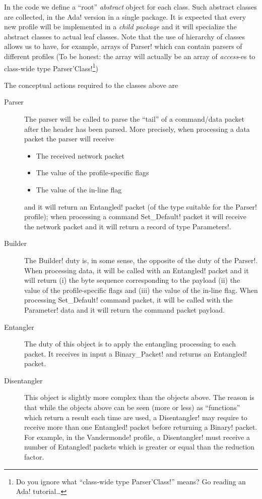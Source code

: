 \documentclass[a4paper]{medusabook}
\begin{document}
%
In the code we define a ``root'' \emph{abstract} object for each
class.  Such abstract classes are collected, in the \ttt Ada! version
in a single package.  It is expected that every new profile will be
implemented in a \emph{child package} and it will specialize the
abstract classes to actual leaf classes.  Note that the use of
hierarchy of classes allows us to have, for example, arrays of \ttt
Parser! which can contain parsers of different profiles (To be honest:
the array will actually be an array of \emph{access}-es to class-wide
type \ttt Parser'Class!\footnote{Do you ignore what ``class-wide
type \ttt Parser'Class!'' means? Go reading an \ttt Ada!
tutorial\ldots})

The conceptual actions required to the classes above are

\begin{description}
  \item[Parser]  The parser will be called to parse the ``tail'' of a
  command/data packet after the header has been parsed.  More
  precisely, when processing a data packet the parser will receive
  \begin{itemize}
    \item The received network packet
    \item The value of the profile-specific flags
    \item The value of the in-line flag
  \end{itemize}
  and it will return an \ttt Entangled! packet (of the type suitable for the
  \ttt Parser! profile); when processing a command \ttt Set_Default!
  packet it will receive the network packet and it will return a
  record of type \ttt Parameters!.
%
  \item[Builder] The \ttt Builder! duty is, in some sense, the
  opposite of the duty of the \ttt Parser!.  When processing data, it
  will be called with an \ttt Entangled! packet and it will return (i)
  the byte sequence corresponding to the payload (ii) the value of the
  profile-specific flags and (iii) the value of the in-line flag.  When
  processing \ttt Set_Default! command packet, it will be called with
  the \ttt Parameter! data and it will return the command packet
  payload.
%
  \item[Entangler] The duty of this object is to apply the entangling
  processing to each packet.  It receives in input a \ttt
  Binary_Packet! and returns an \ttt Entangled! packet.
%
  \item[Disentangler] This object is slightly more complex than the
  objects above.  The reason is that while the objects above can be
  seen (more or less) as ``functions'' which return a result each time
  are used, a \ttt Disentangler! may require to receive more than one
  \ttt Entangled! packet before returning a \ttt Binary! packet.  For
  example, in the \ttt Vandermonde! profile, a \ttt Disentangler! must
  receive a number of \ttt Entangled! packets which is greater or
  equal than the reduction factor.


\end{description}
\end{document}
